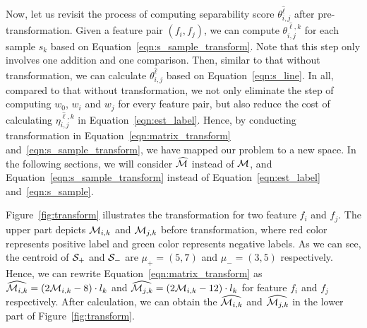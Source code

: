 
Now, let us revisit the process of computing separability score $\theta_{i,j}^{\hat{\ell}}$ after pre-transformation. Given a feature pair $(f_i,f_j)$, we can compute $\theta_{i,j}^{\hat{\ell},k}$ for each sample $s_k$ based on Equation~\ref{eqn:s_sample_transform}. Note that this step only involves one addition and one comparison. Then, similar to that without transformation, we can calculate $\theta_{i,j}^{\hat{\ell}}$ based on Equation~\ref{eqn:s_line}. In all, compared to that without transformation, we not only eliminate the step of computing $w_0$, $w_i$ and $w_j$ for every feature pair, but also reduce the cost of calculating $\eta_{i,j}^{\hat{\ell},k}$ in Equation~\ref{eqn:est_label}. Hence, by conducting transformation in Equation~\ref{eqn:matrix_transform} and~\ref{eqn:s_sample_transform}, we have mapped our problem to a new space. In the following sections, we will consider $\widehat{\mm}$ instead of $\mm$, and Equation~\ref{eqn:s_sample_transform} instead of Equation~\ref{eqn:est_label} and~\ref{eqn:s_sample}.


\begin{example}[Transformation]
Figure~\ref{fig:transform} illustrates the transformation for two feature $f_i$ and $f_j$. The upper part depicts $\mm_{i,k}$ and $\mm_{j,k}$ before transformation, where red color represents positive label and green color represents negative labels. As we can see, the centroid of $\sss_+$ and $\sss_-$ are $\mu_+=(5,7)$ and $\mu_-=(3,5)$ respectively. Hence, we can rewrite Equation~\ref{eqn:matrix_transform} as $\widehat{\mm_{i,k}} = (2\mm_{i,k}-8)\cdot l_k$ and $\widehat{\mm_{j,k}} = (2\mm_{i,k}-12)\cdot l_k$ for feature $f_i$ and $f_j$ respectively. After calculation, we can obtain the $\widehat{\mm_{i,k}}$ and $\widehat{\mm_{j,k}}$ in the lower part of Figure~\ref{fig:transform}.
\end{example}

